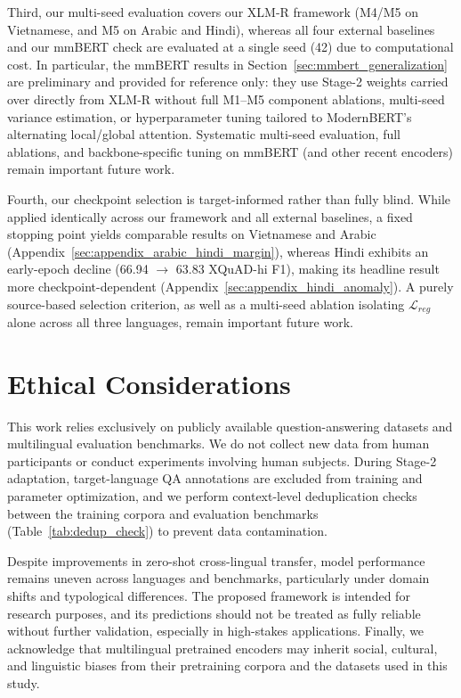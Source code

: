 \documentclass[11pt]{article}
\begin{document}
Third, our multi-seed evaluation covers our XLM-R framework (M4/M5 on Vietnamese, and M5 on Arabic and Hindi), whereas all four external baselines and our mmBERT check are evaluated at a single seed (42) due to computational cost. In particular, the mmBERT results in Section~\ref{sec:mmbert_generalization} are preliminary and provided for reference only: they use Stage-2 weights carried over directly from XLM-R without full M1--M5 component ablations, multi-seed variance estimation, or hyperparameter tuning tailored to ModernBERT's alternating local/global attention. Systematic multi-seed evaluation, full ablations, and backbone-specific tuning on mmBERT (and other recent encoders) remain important future work.

Fourth, our checkpoint selection is target-informed rather than fully blind. While applied identically across our framework and all external baselines, a fixed stopping point yields comparable results on Vietnamese and Arabic (Appendix~\ref{sec:appendix_arabic_hindi_margin}), whereas Hindi exhibits an early-epoch decline (66.94 $\to$ 63.83 XQuAD-hi F1), making its headline result more checkpoint-dependent (Appendix~\ref{sec:appendix_hindi_anomaly}). A purely source-based selection criterion, as well as a multi-seed ablation isolating $\mathcal{L}_{reg}$ alone across all three languages, remain important future work.

\section*{Ethical Considerations}
This work relies exclusively on publicly available question-answering datasets and multilingual evaluation benchmarks. We do not collect new data from human participants or conduct experiments involving human subjects. During Stage-2 adaptation, target-language QA annotations are excluded from training and parameter optimization, and we perform context-level deduplication checks between the training corpora and evaluation benchmarks (Table~\ref{tab:dedup_check}) to prevent data contamination.

Despite improvements in zero-shot cross-lingual transfer, model performance remains uneven across languages and benchmarks, particularly under domain shifts and typological differences. The proposed framework is intended for research purposes, and its predictions should not be treated as fully reliable without further validation, especially in high-stakes applications. Finally, we acknowledge that multilingual pretrained encoders may inherit social, cultural, and linguistic biases from their pretraining corpora and the datasets used in this study.
\end{document}
